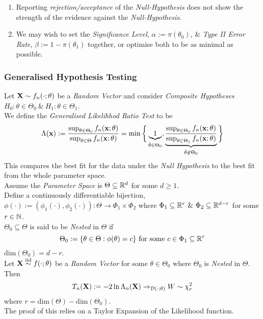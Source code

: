\documentclass[11pt,a4paper]{article}
\begin{document}
\begin{enumerate}
	\item Reporting \textit{rejection/acceptance} of the \textit{Null-Hypothesis} does not show the strength of the evidence against the \textit{Null-Hypothesis}.
	\item We may wish to set the \textit{Significance Level}, $\alpha:=\pi(\theta_0)$, \& \textit{Type II Error Rate}, $\beta:=1-\pi(\theta_1)$ together, or optimise both to be as minimal as possible.
\end{enumerate}

\subsubsection{Generalised Hypothesis Testing}

Let $\textbf{X}\sim f_n(\cdot;\theta)$ be a \textit{Random Vector} and consider \textit{Composite Hypotheses} $H_0:\theta\in\Theta_0\ \&\ H_1:\theta\in\Theta_1$.\\
We define the \textit{Generalised Likelihhod Ratio Test} to be
$$\Lambda(\textbf{x}):=\dfrac{\sup_{\theta\in\Theta_0}f_n(\textbf{x};\theta)}{\sup_{\theta\in\Theta}f_n(\textbf{x};\theta)}=\min\bigg\{\underbrace{1}_{\hat\theta\in\Theta_0},\underbrace{\dfrac{\sup_{\theta\in\Theta_0}f_n(\textbf{x};\theta)}{\sup_{\theta\in\Theta_1}f_n(\textbf{x};\theta)}}_{\hat\theta\not\in\Theta_0}\bigg\}$$
\nb This compares the best fit for the data under the \textit{Null Hypothesis} to the best fit from the whole parameter space.\\

Assume the \textit{Parameter Space} is $\Theta\subseteq\mathbb{R}^d$ for some $d\geq1$.\\
Define a continuously differentiable bijection, $\phi(\cdot):=(\phi_1(\cdot),\phi_2(\cdot)):\Theta\to\Phi_1\times\Phi_2$ where $\Phi_1\subseteq\reals^r\ \&\ \Phi_2\subseteq\reals^{d-r}$ for some $r\in\mathbb{N}$.\\
$\Theta_0\subseteq\Theta$ is said to be \textit{Nested} in $\Theta$ if
$$\Theta_0:=\{\theta\in\Theta:\phi(\theta)=c\}\text{ for some }c\in\Phi_1\subseteq\mathbb{R}^r$$
\nb $\text{dim}(\Theta_0)=d-r$.\\

\theorem{}
Let $\textbf{X}\overset{\text{iid}}{\sim} f(\cdot;\theta)$ be a \textit{Random Vector} for some $\theta\in\Theta_0$ where $\Theta_0$ is \textit{Nested} in $\Theta$.\\
Then
$$T_n(\textbf{X}):=-2\ln\Lambda_n(\textbf{X})\to_{\mathcal{D}(\cdot;\theta)}W\sim\chi^2_r$$
where $r=\text{dim}(\Theta)-\text{dim}(\Theta_0)$.\\
\nb The proof of this relies on a Taylor Expansion of the Likelihood function.\\
\end{document}
